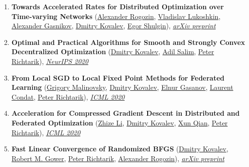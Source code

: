\begin{enumerate}
\item \textbf{Towards Accelerated Rates for Distributed Optimization over Time-varying Networks} (\href{https://scholar.google.com/citations?user=sEjyzkgAAAAJ}{\color{linkcolour}Alexander Rogozin}, \href{}{\color{linkcolour}Vladislav Lukoshkin}, \href{https://scholar.google.ru/citations?user=AmeE8qkAAAAJ}{\color{linkcolour}Alexander Gasnikov}, \href{https://www.dmitry-kovalev.com}{\color{linkcolour}Dmitry Kovalev}, \href{https://shulgin-egor.github.io}{\color{linkcolour}Egor Shulgin}), \href{https://arxiv.org/abs/2009.11069}{\em \color{black}arXiv preprint}
\item \textbf{Optimal and Practical Algorithms for Smooth and Strongly Convex Decentralized Optimization} (\href{https://www.dmitry-kovalev.com}{\color{linkcolour}Dmitry Kovalev}, \href{https://adil-salim.github.io}{\color{linkcolour}Adil Salim}, \href{https://richtarik.org}{\color{linkcolour}Peter Richtarik}), \href{https://papers.nips.cc/paper/2020/hash/d530d454337fb09964237fecb4bea6ce-Abstract.html}{\em \color{black}NeurIPS 2020}
\item \textbf{From Local SGD to Local Fixed Point Methods for Federated Learning} (\href{https://scholar.google.com/citations?user=4w2W9KQAAAAJ}{\color{linkcolour}Grigory Malinovsky}, \href{https://www.dmitry-kovalev.com}{\color{linkcolour}Dmitry Kovalev}, \href{https://elnurgasanov.com}{\color{linkcolour}Elnur Gasanov}, \href{https://lcondat.github.io}{\color{linkcolour}Laurent Condat}, \href{https://richtarik.org}{\color{linkcolour}Peter Richtarik}), \href{http://proceedings.mlr.press/v119/malinovskiy20a.html}{\em \color{black}ICML 2020}
\item \textbf{Acceleration for Compressed Gradient Descent in Distributed and Federated Optimization} (\href{https://zhizeli.github.io}{\color{linkcolour}Zhize Li}, \href{https://www.dmitry-kovalev.com}{\color{linkcolour}Dmitry Kovalev}, \href{https://qianxunk.github.io}{\color{linkcolour}Xun Qian}, \href{https://richtarik.org}{\color{linkcolour}Peter Richtarik}), \href{http://proceedings.mlr.press/v119/li20g.html}{\em \color{black}ICML 2020}
\item \textbf{Fast Linear Convergence of Randomized BFGS} (\href{https://www.dmitry-kovalev.com}{\color{linkcolour}Dmitry Kovalev}, \href{https://gowerrobert.github.io}{\color{linkcolour}Robert M. Gower}, \href{https://richtarik.org}{\color{linkcolour}Peter Richtarik}, \href{https://scholar.google.com/citations?user=sEjyzkgAAAAJ}{\color{linkcolour}Alexander Rogozin}), \href{https://arxiv.org/abs/2002.11337}{\em \color{black}arXiv preprint}

\end{enumerate}
